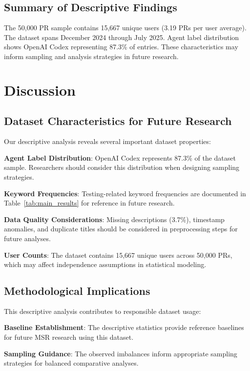 \documentclass[conference]{IEEEtran}
\begin{document}
\subsection{Summary of Descriptive Findings}

The 50,000 PR sample contains 15,667 unique users (3.19 PRs per user average). The dataset spans December 2024 through July 2025. Agent label distribution shows OpenAI Codex representing 87.3\% of entries. These characteristics may inform sampling and analysis strategies in future research.

\section{Discussion}

\subsection{Dataset Characteristics for Future Research}

Our descriptive analysis reveals several important dataset properties:

\textbf{Agent Label Distribution}: OpenAI Codex represents 87.3\% of the dataset sample. Researchers should consider this distribution when designing sampling strategies.

\textbf{Keyword Frequencies}: Testing-related keyword frequencies are documented in Table~\ref{tab:main_results} for reference in future research.

\textbf{Data Quality Considerations}: Missing descriptions (3.7\%), timestamp anomalies, and duplicate titles should be considered in preprocessing steps for future analyses.

\textbf{User Counts}: The dataset contains 15,667 unique users across 50,000 PRs, which may affect independence assumptions in statistical modeling.

\subsection{Methodological Implications}

This descriptive analysis contributes to responsible dataset usage:

\textbf{Baseline Establishment}: The descriptive statistics provide reference baselines for future MSR research using this dataset.

\textbf{Sampling Guidance}: The observed imbalances inform appropriate sampling strategies for balanced comparative analyses.
\end{document}
